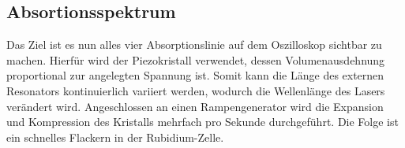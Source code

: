 \subsection{Absortionsspektrum}
Das Ziel ist es nun alles vier Absorptionslinie auf dem Oszilloskop sichtbar zu machen. Hierfür wird der Piezokristall verwendet, dessen Volumenausdehnung proportional zur angelegten Spannung ist. Somit kann die Länge des externen Resonators kontinuierlich variiert werden, wodurch die Wellenlänge des Lasers verändert wird. Angeschlossen an einen Rampengenerator wird die Expansion und Kompression des Kristalls mehrfach pro Sekunde durchgeführt. Die Folge ist ein schnelles Flackern in der Rubidium-Zelle.  


